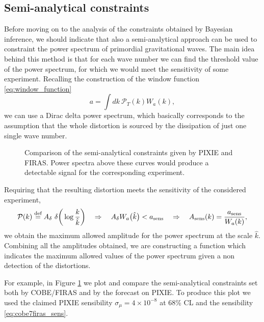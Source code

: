 \subsection{Semi-analytical constraints}
Before moving on to the analysis of the constraints obtained by Bayesian inference, we should indicate that also a semi-analytical approach can be used to constraint the power spectrum of primordial gravitational waves. The main idea behind this method is that for each wave number we can find the threshold value of the power spectrum, for which we would meet the sensitivity of some experiment. Recalling the construction of the window function \eqref{eq:window_function}
$$a=\int dk\ \mathcal P_T(k) W_a(k),$$
we can use a Dirac delta power spectrum, which basically corresponds to the assumption that the whole distortion is sourced by the dissipation of just one single wave number. 
\begin{figure}[t]
    \centering
{}
\caption{Comparison of  the semi-analytical constraints given by PIXIE and FIRAS. Power spectra above these curves would produce a detectable signal for the corresponding experiment.}
\label{fig:analy_const}
\end{figure}
Requiring that the resulting distortion meets the sensitivity of the considered experiment,
$$\mathcal P(k)\stackrel{\text{def}}{=} A_\delta\ \delta\bigg(\log\frac{k}{\hat k}\bigg)\quad \Rightarrow\quad A_\delta W_a\big(\hat k\big)<a_{\text{sens}}\quad \Rightarrow\quad A_{\text{sens}}(k)=\frac{a_{\text{sens}}}{W_a(k)},$$
we obtain the maximum allowed amplitude for the power spectrum at the scale $\hat k$. Combining all the amplitudes obtained, we are constructing a function which indicates the maximum allowed values of the power spectrum given a non detection of the distortions. 

For example, in Figure \ref{fig:analy_const} we plot and compare the semi-analytical constraints set both by COBE/FIRAS and by the forecast on PIXIE. To produce this plot we used the claimed PIXIE sensibility $\sigma_\mu=4\times10^{-8}$ at 68\% CL \cite{Chluba_2021} and the sensibility \eqref{eq:cobe7firas_sens}. 


